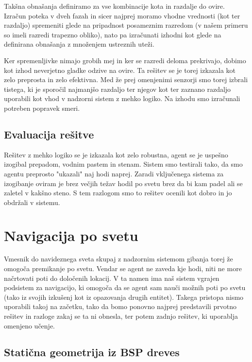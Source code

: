 \documentclass[a4paper,10pt]{article}
\begin{document}
Takšna obnašanja definiramo za vse kombinacije kota in razdalje do ovire. Izračun poteka v dveh fazah in sicer najprej moramo vhodne vrednosti (kot ter razdaljo) spremeniti glede na pripadnost posameznim razredom (v našem primeru so imeli razredi trapezno obliko), nato pa izračunati izhodni kot glede na definirana obnašanja z množenjem ustreznih uteži.

Ker spremenljivke nimajo grobih mej in ker se razredi deloma prekrivajo, dobimo kot izhod neverjetno gladke odzive na ovire. Ta rešitev se je torej izkazala kot zelo preprosta in zelo efektivna. Med že prej omenjenimi senzorji smo torej izbrali tistega, ki je sporočil najmanjšo razdaljo ter njegov kot ter zaznano razdaljo uporabili kot vhod v nadzorni sistem z mehko logiko. Na izhodu smo izračunali potreben popravek smeri.

\subsection{Evaluacija rešitve}

Rešitev z mehko logiko se je izkazala kot zelo robustna, agent se je uspešno izogibal prepadom, vodnim pastem in stenam. Sistem smo testirali tako, da smo agentu preprosto "ukazali" naj hodi naprej. Zaradi vključenega sistema za izogibanje oviram je brez večjih težav hodil po svetu brez da bi kam padel ali se zaletel v kakšno steno. S tem razlogom smo to rešitev ocenili kot dobro in jo obdržali v sistemu.

\section{Navigacija po svetu} \label{sec:navigacija-po-svetu}

Vmesnik do navideznega sveta skupaj z nadzornim sistemom gibanja torej že omogoča premikanje po svetu. Vendar se agent ne zaveda kje hodi, niti ne more načrtovati poti do določenih lokacij. V ta namen ima naš sistem vgrajen podsistem za navigacijo, ki omogoča da se agent sam nauči možnih poti po svetu (tako iz svojih izkušenj kot iz opazovanja drugih entitet). Takega pristopa nismo uporabili takoj na začetku, tako da bomo ponovno najprej predstavili prvotno rešitev in razloge zakaj se ta ni obnesla, ter potem zadnjo rešitev, ki uporablja omenjeno učenje.

\subsection{Statična geometrija iz BSP dreves}
\end{document}
